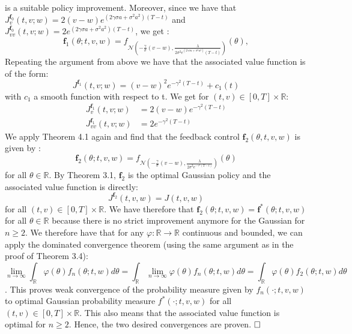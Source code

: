 \documentclass[oneside, a4paper, onecolumn, 11pt]{article}
\begin{document}
is a suitable policy improvement.
Moreover, since we have that $J_{v}^{\boldsymbol{f}_0}(t,v;w)= 2(v-w)e^{(2\gamma \sigma a + \sigma^2 a^2)(T-t)}$ and $J_{vv}^{\boldsymbol{f}_0}(t,v;w) = 2 e^{(2\gamma\sigma a + \sigma^2 a^2)(T-t)}$, we get : 
\begin{equation*}
\boldsymbol{f}_1(\theta;t,v,w) = f_{\mathcal{N}\left(-\frac{\gamma}{\sigma}(v-w), \frac{\lambda}{2\sigma^2 e^(2\gamma \sigma a + \sigma^2 a^2)(T-t)}\right)}(\theta),
\end{equation*}
Repeating the argument from above we have that the associated value function is of the form: 
\begin{equation*}
J^{\boldsymbol{f}_1}(t,v;w)  = (v-w)^2 e^{-\gamma^2(T-t)} + c_1(t)
\end{equation*}
with $c_1$ a smooth function with respect to t. We get for $(t,v)\in [0,T]\times \mathbb{R}$: 
\begin{align}
    J_v^{\boldsymbol{f}_1}(t,v;w)&= 2(v-w)e^{-\gamma^2(T-t)}\\
    J_{vv}^{\boldsymbol{f}_1}(t,v;w)&= 2e^{-\gamma^2(T-t)} 
\end{align}
We apply Theorem 4.1 again and find that the feedback control $\boldsymbol{f}_2(\theta,t,v,w)$ is given by : 
\begin{equation*}
    \boldsymbol{f}_2(\theta;t,v,w) = f_{\mathcal{N}\left(-\frac{\gamma}{\sigma}(v-w),\frac{\lambda}{2\sigma^2e^{-\gamma^2(T-t)}}\right)}(\theta)
\end{equation*}
for all $\theta \in \mathbb{R}$.
By Theorem 3.1, $\boldsymbol{f}_2$ is the optimal Gaussian policy and the associated value function is directly:
\begin{equation}
    J^{\boldsymbol{f}_2}(t,v,w) = J(t,v,w)
\end{equation}
for all $(t,v)\in [0,T] \times \mathbb{R}$.
We have therefore that $\boldsymbol{f}_2(\theta;t,v,w)=\boldsymbol{f}^*(\theta;t,v,w)$ for all $\theta\in \mathbb{R}$ because there is no strict improvement anymore for the Gaussian for $n\geq 2$. 
We therefore have that for any $\varphi : \mathbb{R} \to \mathbb{R}$ continuous and bounded, we can apply the dominated convergence theorem (using the same argument as in the proof of Theorem 3.4):
\begin{equation}
    \lim_{n\to \infty} \int_{\mathbb{R}} \varphi(\theta)f_n(\theta;t,w)d\theta= \int_{\mathbb{R}} \lim_{n\to \infty} \varphi(\theta)f_n(\theta;t,w)d\theta = \int_{\mathbb{R}} \varphi(\theta)f_2(\theta;t,w)d\theta 
\end{equation}.
This proves weak convergence of the probability measure given by $f_n(\cdot;t,v,w)$ to optimal Gaussian probability measure $f^*(\cdot;t,v,w)$ for all $(t,v)\in [0,T] \times \mathbb{R}$.
 This also means that the associated value function is optimal for $n\geq 2$. Hence, the two desired convergences are proven.  $\hfill \square$
\end{document}
